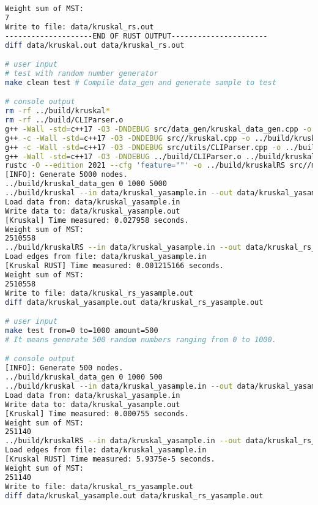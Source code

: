 \begin{lstlisting}[language=bash]
Weight sum of MST:
7
Write to file: data/kruskal_rs.out
--------------------END OF RUST OUTPUT----------------------
diff data/kruskal.out data/kruskal_rs.out

# user input
# test with random number generator
make clean test # Compile data_gen and generate sample to test

# console output
rm -rf ../build/kruskal*
rm -rf ../build/CLIParser.o
g++ -Wall -std=c++17 -O3 -DNDEBUG src/data_gen/kruskal_data_gen.cpp -o ../build/kruskal_data_gen
g++ -c -Wall -std=c++17 -O3 -DNDEBUG src//kruskal.cpp -o ../build/kruskal.o
g++ -c -Wall -std=c++17 -O3 -DNDEBUG src/utils/CLIParser.cpp -o ../build/CLIParser.o
g++ -Wall -std=c++17 -O3 -DNDEBUG ../build/CLIParser.o ../build/kruskal.o -o ../build/kruskal
rustc -O --edition 2021 --cfg 'feature=""' -o ../build/kruskalRS src//main.rs
[INFO]: Generate 5000 nodes.
../build/kruskal_data_gen 0 1000 5000
../build/kruskal --in data/kruskal_yasample.in --out data/kruskal_yasample.out
Load data from: data/kruskal_yasample.in
Write data to: data/kruskal_yasample.out
[Kruskal] Time measured: 0.027958 seconds.
Weight sum of MST:
2510558
../build/kruskalRS --in data/kruskal_yasample.in --out data/kruskal_rs_yasample.out
Load edges from file: data/kruskal_yasample.in
[Kruskal RUST] Time measured: 0.001215166 seconds.
Weight sum of MST:
2510558
Write to file: data/kruskal_rs_yasample.out
diff data/kruskal_yasample.out data/kruskal_rs_yasample.out

# user input
make test from=0 to=1000 amount=500
# It means generate 500 random numbers ranging from 0 to 1000.

# console output
[INFO]: Generate 500 nodes.
../build/kruskal_data_gen 0 1000 500
../build/kruskal --in data/kruskal_yasample.in --out data/kruskal_yasample.out
Load data from: data/kruskal_yasample.in
Write data to: data/kruskal_yasample.out
[Kruskal] Time measured: 0.000755 seconds.
Weight sum of MST:
251140
../build/kruskalRS --in data/kruskal_yasample.in --out data/kruskal_rs_yasample.out
Load edges from file: data/kruskal_yasample.in
[Kruskal RUST] Time measured: 5.9375e-5 seconds.
Weight sum of MST:
251140
Write to file: data/kruskal_rs_yasample.out
diff data/kruskal_yasample.out data/kruskal_rs_yasample.out
\end{lstlisting}

